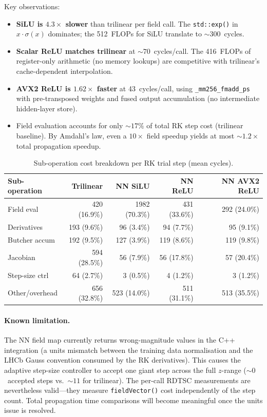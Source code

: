 \documentclass[11pt,a4paper]{article}
\newcommand{\num}[1]{#1}
\begin{document}
Key observations:
\begin{itemize}[nosep]
  \item \textbf{SiLU is $4.3\times$ slower} than trilinear per field call.
    The \texttt{std::exp()} in $x \cdot \sigma(x)$ dominates; the
    \num{512}~FLOPs for SiLU translate to ${\sim}300$~cycles.
  \item \textbf{Scalar ReLU matches trilinear} at ${\sim}70$~cycles/call.
    The \num{416}~FLOPs of register-only arithmetic (no memory lookups)
    are competitive with trilinear's cache-dependent interpolation.
  \item \textbf{AVX2 ReLU is $1.62\times$ faster} at 43~cycles/call,
    using \texttt{\_mm256\_fmadd\_ps} with pre-transposed weights and
    fused output accumulation (no intermediate hidden-layer store).
  \item Field evaluation accounts for only ${\sim}17\%$ of total RK step
    cost (trilinear baseline).  By Amdahl's law, even a $10\times$
    field speedup yields at most ${\sim}1.2\times$ total propagation
    speedup.
\end{itemize}

\begin{table}[H]
\centering
\caption{Sub-operation cost breakdown per RK trial step (mean cycles).}
\label{tab:sub_op_breakdown}
\begin{tabular}{@{} l r r r r @{}}
\toprule
Sub-operation & Trilinear & NN SiLU & NN ReLU & NN AVX2 ReLU \\
\midrule
Field eval       &  420 (16.9\%) & 1982 (70.3\%) & 431 (33.6\%) & 292 (24.0\%) \\
Derivatives      &  193 (9.6\%)  &   96 (3.4\%)  &  94 (7.7\%)  &  95 (9.1\%) \\
Butcher accum    &  192 (9.5\%)  &  127 (3.9\%)  & 119 (8.6\%)  & 119 (9.8\%) \\
Jacobian         &  594 (28.5\%) &   56 (7.9\%)  &  56 (17.8\%) &  57 (20.4\%) \\
Step-size ctrl   &   64 (2.7\%)  &    3 (0.5\%)  &   4 (1.2\%)  &   3 (1.2\%) \\
Other/overhead   &  656 (32.8\%) &  523 (14.0\%) & 511 (31.1\%) & 513 (35.5\%) \\
\bottomrule
\end{tabular}
\end{table}

\paragraph{Known limitation.}
The NN field map currently returns wrong-magnitude values in the C++
integration (a units mismatch between the training data normalisation and
the LHCb Gauss convention consumed by the RK derivatives).  This causes
the adaptive step-size controller to accept one giant step across the
full $z$-range (${\sim}0$~accepted steps vs.\ ${\sim}11$ for trilinear).
The per-call RDTSC measurements are nevertheless valid---they measure
\texttt{fieldVector()} cost independently of the step count.  Total
propagation time comparisons will become meaningful once the units issue
is resolved.
\end{document}
